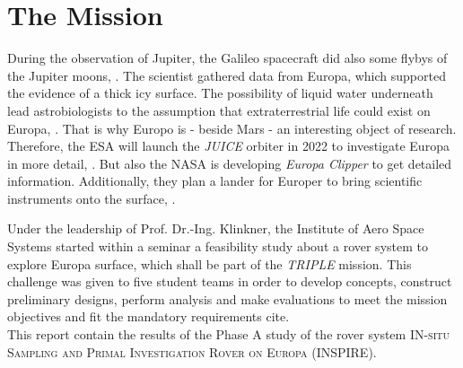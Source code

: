 %
%
%
\chapter{The Mission}
\label{chap:mission}

During the observation  of Jupiter, the Galileo spacecraft did also some flybys of the Jupiter moons, \cite{Mission_01}.
The scientist gathered data from Europa, which supported the evidence of a thick icy surface.
The possibility of liquid water underneath lead astrobiologists to the assumption that extraterrestrial life could exist on Europa, \cite{Mission_02}.
That is why Europo is - beside Mars - an interesting object of research.\\

Therefore, the ESA will launch the \textit{JUICE} orbiter in 2022 to investigate Europa in more detail, \cite{Mission_03}. 
But also the NASA is developing  \textit{Europa Clipper} to get detailed information.
Additionally, they plan a lander for Europer to bring scientific instruments onto the surface, \cite{Mission_04} \cite{Mission_05}.

Under the leadership of  Prof. Dr.-Ing. Klinkner, the Institute of Aero Space Systems started within a seminar a feasibility study about a rover system to explore Europa surface, which shall  be part of the \textit{TRIPLE} mission.
This challenge was given to five student teams in order to develop concepts, construct preliminary designs, perform analysis and make evaluations to  meet the mission objectives and fit the mandatory requirements cite. \\


This report contain the results of the Phase A study of the rover system \textsc{IN-situ Sampling and Primal Investigation Rover on Europa}  (INSPIRE).